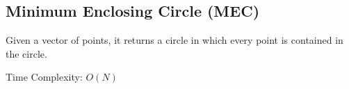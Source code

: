 \subsection{Minimum Enclosing Circle (MEC)}

Given a vector of points, it returns a circle in which every point is contained in the circle.

Time Complexity: $O(N)$
